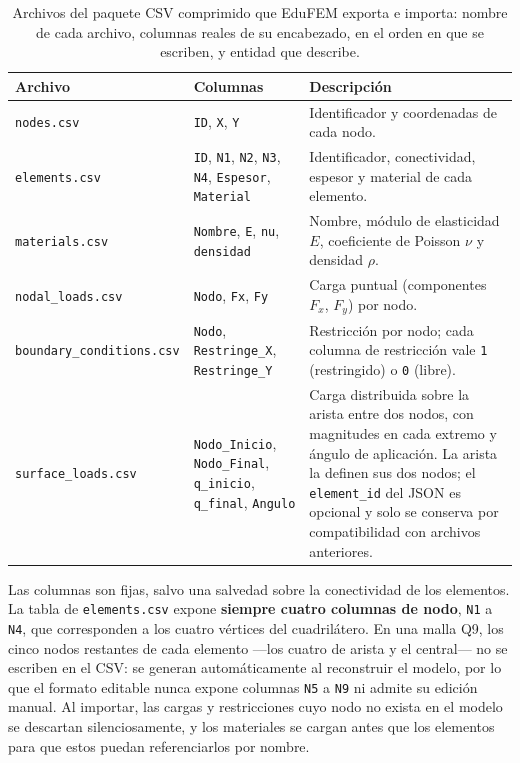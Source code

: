\begin{table}[htbp]
\centering
\caption[Archivos CSV del paquete de modelo y sus columnas.]{Archivos del paquete CSV comprimido que EduFEM exporta e importa: nombre de cada archivo, columnas reales de su encabezado, en el orden en que se escriben, y entidad que describe.}
\label{tab:csv-archivos}
\begin{tabular}{p{3.6cm} p{5.0cm} p{4.6cm}}
\toprule
\textbf{Archivo} & \textbf{Columnas} & \textbf{Descripción} \\
\midrule
\texttt{nodes.csv} & \texttt{ID}, \texttt{X}, \texttt{Y} & Identificador y coordenadas de cada nodo. \\
\texttt{elements.csv} & \texttt{ID}, \texttt{N1}, \texttt{N2}, \texttt{N3}, \texttt{N4}, \texttt{Espesor}, \texttt{Material} & Identificador, conectividad, espesor y material de cada elemento. \\
\texttt{materials.csv} & \texttt{Nombre}, \texttt{E}, \texttt{nu}, \texttt{densidad} & Nombre, módulo de elasticidad $E$, coeficiente de Poisson $\nu$ y densidad $\rho$. \\
\texttt{nodal\_loads.csv} & \texttt{Nodo}, \texttt{Fx}, \texttt{Fy} & Carga puntual (componentes $F_x$, $F_y$) por nodo. \\
\texttt{boundary\_conditions.csv} & \texttt{Nodo}, \texttt{Restringe\_X}, \texttt{Restringe\_Y} & Restricción por nodo; cada columna de restricción vale \texttt{1} (restringido) o \texttt{0} (libre). \\
\texttt{surface\_loads.csv} & \texttt{Nodo\_Inicio}, \texttt{Nodo\_Final}, \texttt{q\_inicio}, \texttt{q\_final}, \texttt{Angulo} & Carga distribuida sobre la arista entre dos nodos, con magnitudes en cada extremo y ángulo de aplicación. La arista la definen sus dos nodos; el \texttt{element\_id} del JSON es opcional y solo se conserva por compatibilidad con archivos anteriores. \\
\bottomrule
\end{tabular}
\end{table}

Las columnas son fijas, salvo una salvedad sobre la conectividad de los elementos. La tabla de \texttt{elements.csv} expone \textbf{siempre cuatro columnas de nodo}, \texttt{N1} a \texttt{N4}, que corresponden a los cuatro vértices del cuadrilátero. En una malla Q9, los cinco nodos restantes de cada elemento ---los cuatro de arista y el central--- no se escriben en el CSV: se generan automáticamente al reconstruir el modelo, por lo que el formato editable nunca expone columnas \texttt{N5} a \texttt{N9} ni admite su edición manual. Al importar, las cargas y restricciones cuyo nodo no exista en el modelo se descartan silenciosamente, y los materiales se cargan antes que los elementos para que estos puedan referenciarlos por nombre.

